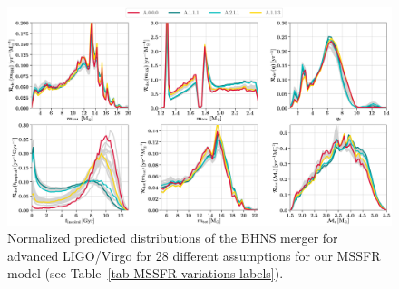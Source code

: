 \documentclass[twocolumn]{aastex63}
\newcommand\bhnsSingle{BHNS\xspace}
\begin{document}




\newpage 


\appendix








%
\begin{figure}
\label{fig:MSSFRvariationsPlot}
    \centering
\includegraphics[width=1.0\textwidth]{../PlottingScripts/4_MSSFR_observed/ObservedDistributionsFiducial_MSSFR_gaussianKDE_highlight.png} %
    \caption{Normalized predicted distributions of the \bhnsSingle merger for advanced LIGO/Virgo for 28 different assumptions for our \ac{MSSFR} model (see Table~\ref{tab-MSSFR-variations-labels}).  }%
\end{figure}
%
\end{document}
